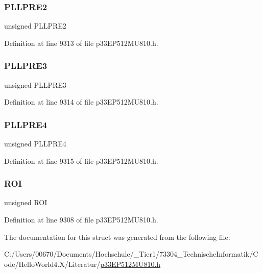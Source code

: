 \subsubsection{\texorpdfstring{P\+L\+L\+P\+R\+E2}{PLLPRE2}}
{\footnotesize\ttfamily unsigned P\+L\+L\+P\+R\+E2}



Definition at line 9313 of file p33\+E\+P512\+M\+U810.\+h.

\mbox{\label{structtag_c_l_k_d_i_v_b_i_t_s_a6cac311c5c7b7bbcfbf6733e81d541ec}} 
\subsubsection{\texorpdfstring{P\+L\+L\+P\+R\+E3}{PLLPRE3}}
{\footnotesize\ttfamily unsigned P\+L\+L\+P\+R\+E3}



Definition at line 9314 of file p33\+E\+P512\+M\+U810.\+h.

\mbox{\label{structtag_c_l_k_d_i_v_b_i_t_s_a70f066b5e9b78deee7bfaa70c06b4663}} 
\subsubsection{\texorpdfstring{P\+L\+L\+P\+R\+E4}{PLLPRE4}}
{\footnotesize\ttfamily unsigned P\+L\+L\+P\+R\+E4}



Definition at line 9315 of file p33\+E\+P512\+M\+U810.\+h.

\mbox{\label{structtag_c_l_k_d_i_v_b_i_t_s_ac2c7f9712fe29871c3e7846eb2f5c770}} 
\subsubsection{\texorpdfstring{R\+OI}{ROI}}
{\footnotesize\ttfamily unsigned R\+OI}



Definition at line 9308 of file p33\+E\+P512\+M\+U810.\+h.



The documentation for this struct was generated from the following file\+:\begin{DoxyCompactItemize}
\item 
C\+:/\+Users/00670/\+Documents/\+Hochschule/\+\_\+\+Tier1/73304\+\_\+\+Technische\+Informatik/\+Code/\+Hello\+World4.\+X/\+Literatur/\hyperlink{p33_e_p512_m_u810_8h}{p33\+E\+P512\+M\+U810.\+h}\end{DoxyCompactItemize}
